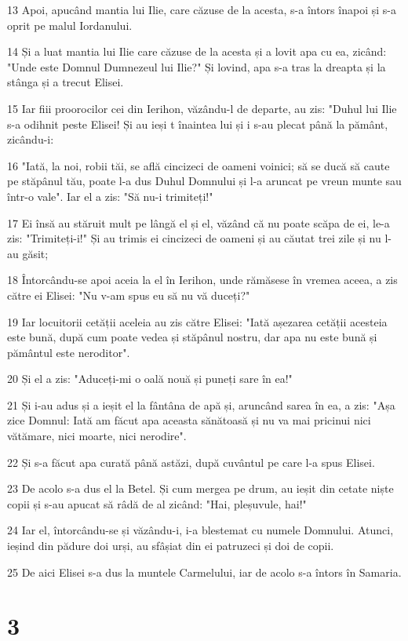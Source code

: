 \par 13 Apoi, apucând mantia lui Ilie, care căzuse de la acesta, s-a întors înapoi și s-a oprit pe malul Iordanului.
\par 14 Și a luat mantia lui Ilie care căzuse de la acesta și a lovit apa cu ea, zicând: "Unde este Domnul Dumnezeul lui Ilie?" Și lovind, apa s-a tras la dreapta și la stânga și a trecut Elisei.
\par 15 Iar fiii proorocilor cei din Ierihon, văzându-l de departe, au zis: "Duhul lui Ilie s-a odihnit peste Elisei! Și au ieși t înaintea lui și i s-au plecat până la pământ, zicându-i:
\par 16 "Iată, la noi, robii tăi, se află cincizeci de oameni voinici; să se ducă să caute pe stăpânul tău, poate l-a dus Duhul Domnului și l-a aruncat pe vreun munte sau într-o vale". Iar el a zis: "Să nu-i trimiteți!"
\par 17 Ei însă au stăruit mult pe lângă el și el, văzând că nu poate scăpa de ei, le-a zis: "Trimiteți-i!" Și au trimis ei cincizeci de oameni și au căutat trei zile și nu l-au găsit;
\par 18 Întorcându-se apoi aceia la el în Ierihon, unde rămăsese în vremea aceea, a zis către ei Elisei: "Nu v-am spus eu să nu vă duceți?"
\par 19 Iar locuitorii cetății aceleia au zis către Elisei: "Iată așezarea cetății acesteia este bună, după cum poate vedea și stăpânul nostru, dar apa nu este bună și pământul este neroditor".
\par 20 Și el a zis: "Aduceți-mi o oală nouă și puneți sare în ea!"
\par 21 Și i-au adus și a ieșit el la fântâna de apă și, aruncând sarea în ea, a zis: "Așa zice Domnul: Iată am făcut apa aceasta sănătoasă și nu va mai pricinui nici vătămare, nici moarte, nici nerodire".
\par 22 Și s-a făcut apa curată până astăzi, după cuvântul pe care l-a spus Elisei.
\par 23 De acolo s-a dus el la Betel. Și cum mergea pe drum, au ieșit din cetate niște copii și s-au apucat să râdă de al zicând: "Hai, pleșuvule, hai!"
\par 24 Iar el, întorcându-se și văzându-i, i-a blestemat cu numele Domnului. Atunci, ieșind din pădure doi urși, au sfâșiat din ei patruzeci și doi de copii.
\par 25 De aici Elisei s-a dus la muntele Carmelului, iar de acolo s-a întors în Samaria.

\chapter{3}

